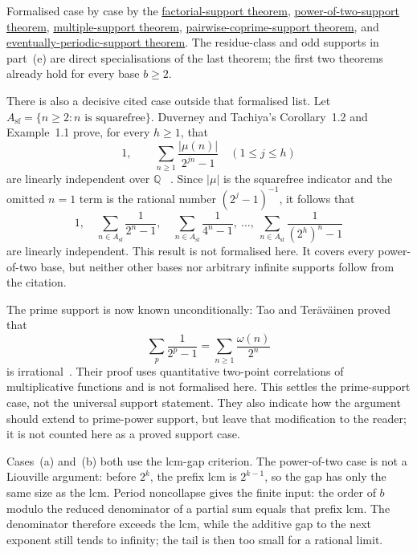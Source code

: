 \documentclass[11pt]{article}
\newcommand{\commit}{99f4bf47422abbd8757cbb22b50ba079d764d3a7}
\newcommand{\repobase}{https://github.com/wcook04/plectis-erdos/blob/\commit}
\newcommand{\PK}{Erdos249257}
\newcommand{\lword}[4]{\href{\repobase/\PK/#1\#L#2}{#4}}
\theoremstyle{definition}
\theoremstyle{remark}
\newcommand{\Q}{\mathbb{Q}}
\begin{document}
\noindent Formalised case by case by the
\lword{CertificateKernel.lean}{6035}{irrational_erdosSum_factorial_support}{factorial-support theorem},
\lword{CertificateKernel.lean}{6059}{irrational_erdosSum_two_pow_support}{power-of-two-support theorem},
\lword{CertificateKernel.lean}{9103}{irrational_erdosSupportSeries_multiples}{multiple-support theorem},
\lword{CertificateKernel.lean}{10776}{irrational_erdosSupportSeries_pairwise_coprime}{pairwise-coprime-support theorem},
and
\lword{CertificateKernel.lean}{11604}{irrational_erdosSupportSeries_eventuallyPeriodic}{eventually-periodic-support theorem}.
The residue-class and odd supports in part~\textup{(e)} are direct
specialisations of the last theorem; the first two theorems already hold for
every base \(b\geq2\).

There is also a decisive cited case outside that formalised list.  Let
\(A_{\mathrm{sf}}=\{n\ge2:n\text{ is squarefree}\}\).  Duverney and Tachiya's
Corollary~1.2 and Example~1.1 prove, for every \(h\ge1\), that
\[
  1,\qquad
  \sum_{n\ge1}\frac{|\mu(n)|}{2^{jn}-1}\quad(1\le j\le h)
\]
are linearly independent over \(\Q\)
~\cite[Cor.~1.2 and Ex.~1.1, author-preprint p.~4]{duverneytachiya}.  Since
\(|\mu|\) is the squarefree indicator and the omitted \(n=1\) term is the
rational number \((2^j-1)^{-1}\), it follows that
\[
  1,\quad
  \sum_{n\in A_{\mathrm{sf}}}\frac1{2^n-1},\quad
  \sum_{n\in A_{\mathrm{sf}}}\frac1{4^n-1},\ \ldots,\
  \sum_{n\in A_{\mathrm{sf}}}\frac1{(2^h)^n-1}
\]
are linearly independent.  This result is not formalised here.  It covers
every power-of-two base, but neither other bases nor arbitrary infinite
supports follow from the citation.

The prime support is now known unconditionally: Tao and Ter\"av\"ainen proved
that
\[
  \sum_p\frac1{2^p-1}=\sum_{n\ge1}\frac{\omega(n)}{2^n}
\]
is irrational~\cite[Theorem~1.3, p.~4; proof in Section~5,
pp.~44--56]{taoteravainen}. Their proof uses quantitative two-point
correlations of multiplicative functions and is not formalised here. This
settles the prime-support case, not the universal support statement.
They also indicate how the argument should extend to
prime-power support, but leave that modification to the reader; it is not
counted here as a proved support case.

Cases~\textup{(a)} and~\textup{(b)} both use the lcm-gap criterion.  The
power-of-two case is not a Liouville argument: before \(2^k\), the prefix lcm is
\(2^{k-1}\), so the gap has only the same size as the lcm.  Period noncollapse
gives the finite input: the order of \(b\) modulo the reduced denominator of a
partial sum equals that prefix lcm.  The denominator therefore exceeds the lcm,
while the additive gap to the next exponent still tends to infinity; the tail
is then too small for a rational limit.
\end{document}
